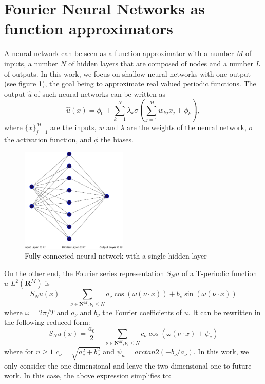 \documentclass[AMS,STIX1COL]{WileyNJD-v2}
\begin{document}
 





\section{Fourier Neural Networks as function approximators}\label{sec:fnn}
A neural network can be seen as a function approximator with a number $M$ of inputs, a number $N$ of hidden layers that are composed of nodes and a number $L$ of outputs. In this work, we focus on shallow neural networks with one output (see figure \ref{fig:NN_single}), the goal being to approximate real valued periodic functions. The output $\hat{u}$ of such neural networks  can be written as
\begin{equation}\label{Eq: NN}
  \hat{u}(x) = \phi_0 + \sum_{k = 1}^N \lambda_{k} \sigma\left(\sum_{j = 1}^M w_{kj}x_j + \phi_k \right),
\end{equation}
where $\{x\}_{j = 1}^M$ are the inputs, $w$ and $\lambda$ are the weights of the neural network, $\sigma$ the activation function, and $\phi$ the biases. 
\begin{figure}[htb]
    \centering
    \includegraphics[width=0.45\textwidth]{nn.eps}
    \caption{Fully connected neural network with a single hidden layer}
    \label{fig:NN_single}
\end{figure}
On the other end, the Fourier series representation $S_N u$ of a T-periodic function $u$ \in $L^2(\mathbf R^M)$ is
\begin{equation}\label{Eq: fourier}
    S_{N}u(x) = \sum_{\nu \in \mathbf{N}^M, \nu_{i}\leq N} a_{\nu} \cos(\omega (\nu\cdot x)) + b_{\nu} \sin(\omega(\nu\cdot x)) 
\end{equation}
where $\omega = 2\pi/T$ and $a_{\nu}$ and $b_{\nu}$ the Fourier coefficients of $u$. It can be rewritten in the following reduced form:
 \begin{equation}\label{Eq: fourier_shift}
     S_N u(x) = \frac{a_0}{2} + \sum_{\nu \in \mathbf{N}^M, \nu_{i}\leq N} c_{\nu} \cos(\omega (\nu\cdot x) + \psi_{\nu})
 \end{equation}
where for $n \geq 1$ $c_{\nu} = \sqrt{a_{\nu}^2 + b_{\nu}^2}$ and $\psi_n = arctan2(-b_{\nu}/a_{\nu})$. In this work, we only consider the one-dimensional and leave the two-dimensional one to future work. In this case, the above expression simplifies to:
\end{document}
